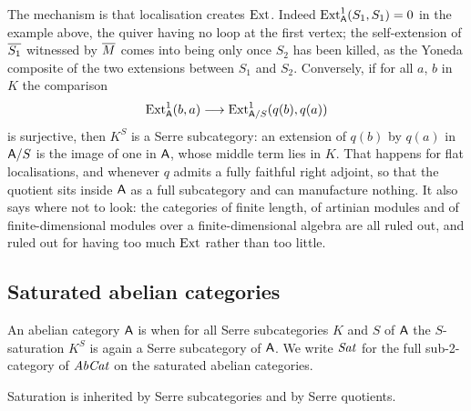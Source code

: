 \begin{remark}
  \label{Rem Ext}
  The mechanism is that localisation creates \(\operatorname{Ext}\). Indeed \(\operatorname{Ext}^{1}_{\mathsf{A}}(S_{1},S_{1})=0\) in the example above, the quiver having no loop at the first vertex; the self-extension of \(\overline{S_{1}}\) witnessed by \(\overline{M}\) comes into being only once \(S_{2}\) has been killed, as the Yoneda composite of the two extensions between \(S_{1}\) and \(S_{2}\). Conversely, if for all \(a\), \(b\) in \(K\) the comparison
	\[
		\operatorname{Ext}^{1}_{\mathsf{A}}(b,a)\longrightarrow\operatorname{Ext}^{1}_{\mathsf{A}/S}(q(b),q(a))
	\]
	is surjective, then \(K^{S}\) is a Serre subcategory: an extension of \(q(b)\) by \(q(a)\) in \(\mathsf{A}/S\) is the image of one in \(\mathsf{A}\), whose middle term lies in \(K\). That happens for flat localisations, and whenever \(q\) admits a fully faithful right adjoint, so that the quotient sits inside \(\mathsf{A}\) as a full subcategory and can manufacture nothing. It also says where not to look: the categories of finite length, of artinian modules and of finite-dimensional modules over a finite-dimensional algebra are all ruled out, and ruled out for having too much \(\operatorname{Ext}\) rather than too little.
\end{remark}

\subsection{Saturated abelian categories}\label{SS:ModelSAT}

\begin{definition}
  \label{D:SAT}  \leanok
  An abelian category \(\mathsf{A}\) is  when for all Serre subcategories \(K\) and \(S\) of \(\mathsf{A}\) the \(S\)-saturation \(K^{S}\) is again a Serre subcategory of \(\mathsf{A}\). We write \(\mathit{Sat}\) for the full sub-2-category of \(\mathit{AbCat}\) on the saturated abelian categories.
\end{definition}

\begin{proposition}
  \label{P:SATclosed}  
  Saturation is inherited by Serre subcategories and by Serre quotients.
\end{proposition}

